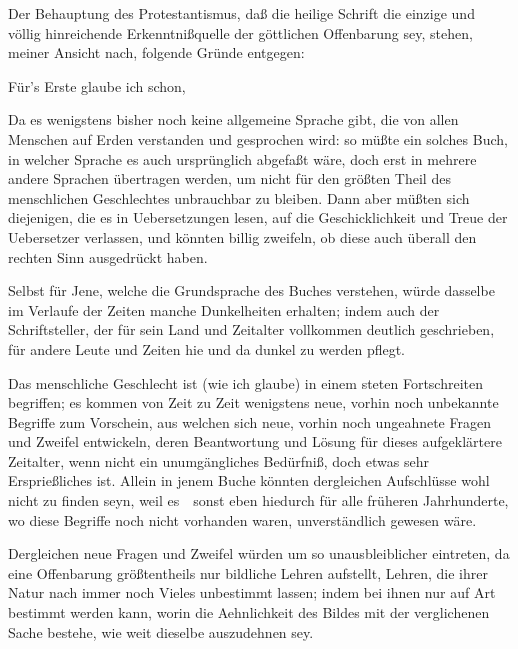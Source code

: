 Der Behauptung des Protestantismus, daß die heilige Schrift die einzige und völlig hinreichende Erkenntnißquelle der göttlichen Offenbarung sey, stehen, meiner Ansicht nach, folgende Gründe entgegen:
\begin{aufza}
\item Für's Erste glaube ich schon, 
\begin{aufzb}
\item Da es wenigstens bisher noch keine allgemeine Sprache gibt, die von allen Menschen auf Erden verstanden und gesprochen wird: so müßte ein solches Buch, in welcher Sprache es auch ursprünglich abgefaßt wäre, doch erst in mehrere andere Sprachen übertragen werden, um nicht für den größten Theil des menschlichen Geschlechtes unbrauchbar zu bleiben. Dann aber müßten sich diejenigen, die es in Uebersetzungen lesen, auf die Geschicklichkeit und Treue der Uebersetzer verlassen, und könnten billig zweifeln, ob diese auch überall den rechten Sinn ausgedrückt haben.
\item Selbst für Jene, welche die Grundsprache des Buches verstehen, würde dasselbe im Verlaufe der Zeiten manche Dunkelheiten erhalten; indem auch der Schriftsteller, der für sein Land und Zeitalter vollkommen deutlich geschrieben, für andere Leute und Zeiten hie und da dunkel zu werden pflegt.
\item Das menschliche Geschlecht ist (wie ich glaube) in einem steten Fortschreiten begriffen; es kommen von Zeit zu Zeit wenigstens neue, vorhin noch unbekannte Begriffe zum Vorschein, aus welchen sich neue, vorhin noch ungeahnete Fragen und Zweifel entwickeln, deren Beantwortung und Lösung für dieses aufgeklärtere Zeitalter, wenn nicht ein unumgängliches Bedürfniß, doch etwas sehr Ersprießliches ist. Allein in jenem Buche könnten dergleichen Aufschlüsse wohl nicht zu finden seyn, weil es~\ sonst eben hiedurch für alle früheren Jahrhunderte, wo diese Begriffe noch nicht vorhanden waren, unverständlich gewesen wäre.
\item Dergleichen neue Fragen und Zweifel würden um so unausbleiblicher eintreten, da eine Offenbarung größtentheils nur bildliche Lehren aufstellt, Lehren, die ihrer Natur nach immer noch Vieles unbestimmt lassen; indem bei ihnen nur auf  Art bestimmt werden kann, worin die Aehnlichkeit des Bildes mit der verglichenen Sache  bestehe, wie weit dieselbe  auszudehnen sey.

\end{aufzb}
\end{aufza}
